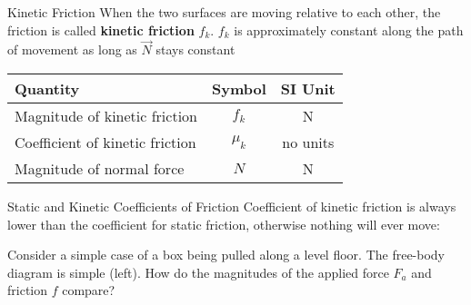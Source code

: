 \documentclass[12pt,compress,aspectratio=169]{beamer}
\begin{document}
\begin{frame}{Kinetic Friction}
  When the two surfaces are moving relative to each other, the friction is
  called \textbf{kinetic friction} $f_k$. $f_k$ is approximately constant along
  the path of movement as long  as $\vec N$ stays constant

  \begin{center}
    \begin{tabular}{l|c|c}
      \rowcolor{pink}
      \textbf{Quantity} & \textbf{Symbol} & \textbf{SI Unit} \\ \hline
      Magnitude of kinetic friction   & $f_k$ & \si\newton \\
      Coefficient of kinetic friction & $\mu_k$ & no units \\
      Magnitude of normal force       & $N$ & \si\newton
    \end{tabular}
  \end{center}
\end{frame}



\begin{frame}{Static and Kinetic Coefficients of Friction}    
  Coefficient of kinetic friction is always lower than the coefficient for
  static friction, otherwise nothing will ever move:
    

  \vspace{-.2in}Consider a simple case of a box being pulled along a level
  floor. The free-body diagram is simple (left). How do the magnitudes of the
  applied force $F_a$ and friction $f$ compare?

  \begin{columns}
    \centering

    \centering
  \end{columns}
\end{frame}
\end{document}
